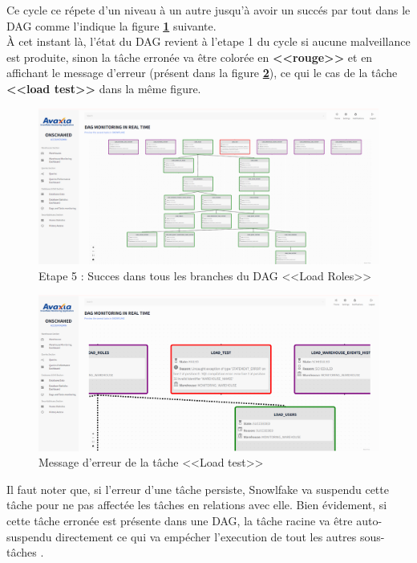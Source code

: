 \par Ce cycle ce répete d'un niveau à un autre jusqu'à avoir un succés par tout dans le DAG comme l'indique la figure \textbf{\ref{fig:final}} suivante.\\
 À cet instant là, l'état du DAG revient à l'etape 1 du cycle si aucune malveillance est produite, sinon la tâche erronée va être colorée en \textbf{<<rouge>>}  et en affichant le message d'erreur (présent dans la figure \textbf{\ref{fig:error}}), ce qui le cas de la tâche \textbf{<<load test>>} dans la même figure. 
\begin{figure}[H]
    \centering
    \includegraphics[width =1\linewidth]{img/captures/dag/final/failed.png}
    \caption{Etape 5 : Succes dans tous les branches du DAG <<Load Roles>>}
    \label{fig:final}
    \end{figure}
    \begin{figure}[H]
        \centering
        \includegraphics[width =1\linewidth]{img/captures/dag/final/reason.png}
        \caption{Message d'erreur de la tâche <<Load test>>}
        \label{fig:error}
        \end{figure}
\par Il faut noter que, si l'erreur d'une tâche persiste, Snowlfake va suspendu cette tâche pour ne pas affectée les tâches en relations avec elle. 
Bien évidement, si cette tâche erronée est présente dans une DAG, la tâche racine va être auto-suspendu directement ce qui va empécher l'execution de tout les autres sous-tâches \cite{auto}. 
